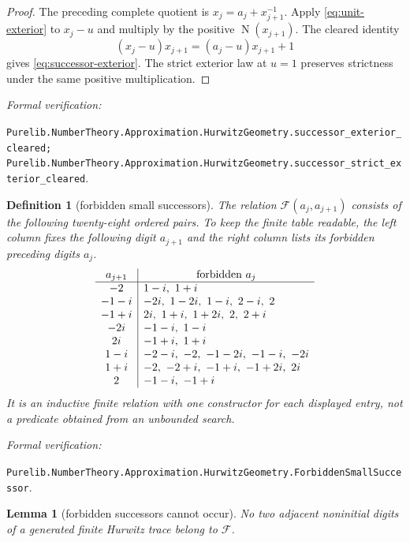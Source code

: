 \documentclass[11pt]{article}
\newtheorem{lemma}[lemma]{Lemma}
\newtheorem{definition}[definition]{Definition}
\newcommand{\Norm}[1]{\operatorname{N}\!\left(#1\right)}
\newcommand{\leanref}[1]{\par\smallskip\noindent
  \emph{Formal verification:}\par\nobreak
  {\raggedright\nolinkurl{#1}.\par}}
\begin{document}
\begin{proof}
The preceding complete quotient is
$x_j=a_j+x_{j+1}^{-1}$.  Apply
\eqref{eq:unit-exterior} to $x_j-u$ and multiply by the positive
$\Norm{x_{j+1}}$.  The cleared identity
\[
                 (x_j-u)x_{j+1}=(a_j-u)x_{j+1}+1
\]
gives \eqref{eq:successor-exterior}.  The strict exterior law at $u=1$
preserves strictness under the same positive multiplication.
\end{proof}

\leanref{Purelib.NumberTheory.Approximation.HurwitzGeometry.successor_exterior_cleared;
Purelib.NumberTheory.Approximation.HurwitzGeometry.successor_strict_exterior_cleared}

\begin{definition}[forbidden small successors]
\label{def:forbidden-successors}
The relation $\mathcal F(a_j,a_{j+1})$ consists of the following twenty-eight
ordered pairs.  To keep the finite table readable, the left column fixes the
following digit $a_{j+1}$ and the right column lists its forbidden preceding
digits $a_j$.
\[
\begin{array}{c|l}
a_{j+1} & \multicolumn{1}{c}{\text{forbidden }a_j}\\ \hline
-2      & 1-i,\ 1+i\\
-1-i    & -2i,\ 1-2i,\ 1-i,\ 2-i,\ 2\\
-1+i    & 2i,\ 1+i,\ 1+2i,\ 2,\ 2+i\\
-2i     & -1-i,\ 1-i\\
 2i     & -1+i,\ 1+i\\
 1-i    & -2-i,\ -2,\ -1-2i,\ -1-i,\ -2i\\
 1+i    & -2,\ -2+i,\ -1+i,\ -1+2i,\ 2i\\
 2      & -1-i,\ -1+i
\end{array}
\]
It is an inductive finite relation with one constructor for each displayed
entry, not a predicate obtained from an unbounded search.
\end{definition}

\leanref{Purelib.NumberTheory.Approximation.HurwitzGeometry.ForbiddenSmallSuccessor}

\begin{lemma}[forbidden successors cannot occur]
\label{lem:no-forbidden-successor}
No two adjacent noninitial digits of a generated finite Hurwitz trace belong
to $\mathcal F$.
\end{lemma}
\end{document}
